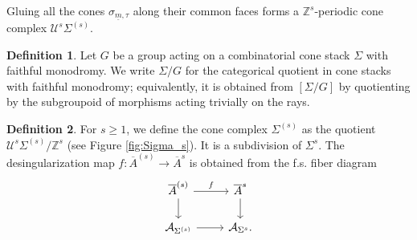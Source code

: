 \documentclass[11pt]{article}
\def\ZZ{\mathbb{Z}}
\newcommand{\barA}{\overline{A}}
\theoremstyle{definition}
\newtheorem{definition}{Definition}[section]
\begin{document}
Gluing all the cones $\sigma_{\underline{m}, \tau}$ along their common faces forms a $\ZZ^s$-periodic cone complex $\mathcal U^s\Sigma^{(s)}$.

\begin{definition}
    Let $G$ be a group acting on a combinatorial cone stack $\Sigma$ with faithful monodromy. We write $\Sigma/G$ for the categorical quotient in cone
    stacks with faithful monodromy; equivalently, it is obtained from $[\Sigma/G]$ by quotienting by the subgroupoid of morphisms acting trivially on the rays.
\end{definition}

\begin{definition}
	For $s\geq 1$, we define the cone complex $\Sigma^{(s)}$ as the quotient $\mathcal U^s\Sigma^{(s)}/\ZZ^s$ (see Figure \ref{fig:Sigma_s}). It is a subdivision of $\Sigma^s$. The desingularization map $f:\barA^{(s)}\to\barA^s$ is obtained from the f.s. fiber diagram
    $$
    \begin{tikzcd}
        \barA^{(s)} \ar[r, "f"] \ar[d]  & \barA^s \ar[d] \\
        \mathcal A_{\Sigma^{(s)}} \ar[r] & \mathcal{A}_{\Sigma^s}.
    \end{tikzcd}
    $$
\end{definition}
\end{document}
